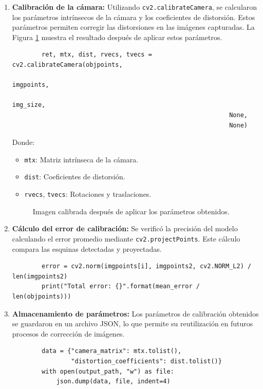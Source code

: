 \begin{enumerate}
        \item \textbf{Calibración de la cámara:} 
        Utilizando \texttt{cv2.calibrateCamera}, se calcularon los parámetros intrínsecos de la cámara y los coeficientes de distorsión. Estos parámetros permiten corregir las distorsiones en las imágenes capturadas. La Figura \ref{fig:imagen_calibrada} muestra el resultado después de aplicar estos parámetros.
        \begin{verbatim}
        ret, mtx, dist, rvecs, tvecs = cv2.calibrateCamera(objpoints, 
                                                           imgpoints, 
                                                           img_size, 
                                                           None, 
                                                           None)
        \end{verbatim}
        Donde:
        \begin{itemize}
            \item \texttt{mtx}: Matriz intrínseca de la cámara.
            \item \texttt{dist}: Coeficientes de distorsión.
            \item \texttt{rvecs}, \texttt{tvecs}: Rotaciones y traslaciones.
        \end{itemize}
        \begin{center}
            \begin{figure}[h!]
                \centering
                \caption{Imagen calibrada después de aplicar los parámetros obtenidos.}
                \label{fig:imagen_calibrada}
            \end{figure}
        \end{center}
    
        \item \textbf{Cálculo del error de calibración:} 
        Se verificó la precisión del modelo calculando el error promedio mediante \texttt{cv2.projectPoints}. Este cálculo compara las esquinas detectadas y proyectadas.
        \begin{verbatim}
        error = cv2.norm(imgpoints[i], imgpoints2, cv2.NORM_L2) / len(imgpoints2)
        print("Total error: {}".format(mean_error / len(objpoints)))
        \end{verbatim}
    
        \item \textbf{Almacenamiento de parámetros:} 
        Los parámetros de calibración obtenidos se guardaron en un archivo JSON, lo que permite su reutilización en futuros procesos de corrección de imágenes.
        \begin{verbatim}
        data = {"camera_matrix": mtx.tolist(), 
                "distortion_coefficients": dist.tolist()}
        with open(output_path, "w") as file:
            json.dump(data, file, indent=4)
        \end{verbatim}
    \end{enumerate}
    
